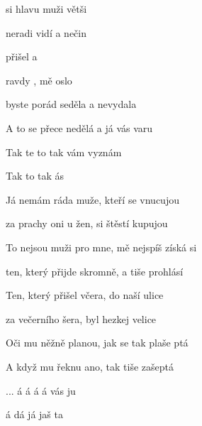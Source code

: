 
 
 
 
 

\zs
{} si hlavu 
 muži větši

neradi vidí 
 a nečin

 přišel 
 a  

ravdy ,
 mě oslo
\ks

\zr
{} byste porád seděla
a nevydala 

A to se přece nedělá
a já vás varu

Tak te to 
tak  vám vyznám 

Tak  to 
tak ás 

     
\kr

\zs
Já nemám ráda muže,
kteří se vnucujou

za prachy oni u žen,
si štěstí kupujou

To nejsou muži pro mne,
mě nejspíš získá si

ten, který přijde skromně,
a tiše prohlásí
\ks

\zr \kr

\zs
Ten, který přišel včera,
do naší ulice

za večerního šera,
byl hezkej velice

Oči mu něžně planou,
jak se tak plaše ptá

A když mu řeknu ano,
tak tiše zašeptá
\ks

\zr

... á á á á vás ju

á dá  já jaš ta 
\kr
\kp


